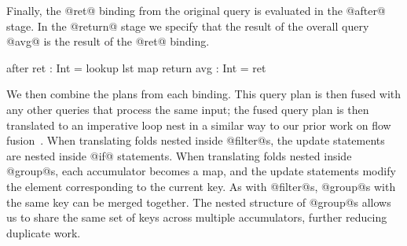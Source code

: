 
Finally, the @ret@ binding from the original query is evaluated in the @after@ stage. In the @return@ stage we specify that the result of the overall query @avg@ is the result of the @ret@ binding.
\begin{icicle-core}
  after  { ret : Int = lookup lst map }
  return { avg : Int = ret }
\end{icicle-core}


We then combine the plans from each binding.
This query plan is then fused with any other queries that process the same input; the fused query plan is then translated to an imperative loop nest in a similar way to our prior work on flow fusion~\cite{lippmeier2013data}.
When translating folds nested inside @filter@s, the update statements are nested inside @if@ statements.
When translating folds nested inside @group@s, each accumulator becomes a map, and the update statements modify the element corresponding to the current key.
As with @filter@s, @group@s with the same key can be merged together.
The nested structure of @group@s allows us to share the same set of keys across multiple accumulators, further reducing duplicate work.

